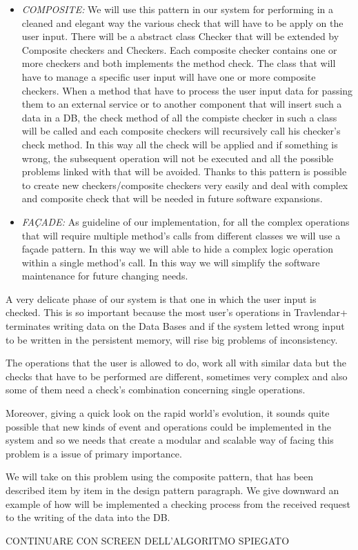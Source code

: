 \begin{itemize}
\item \emph{COMPOSITE:} We will use this pattern in our system for performing in a cleaned and elegant way the various check that will have to be apply on the user input. There will be a abstract class Checker that will be extended by Composite checkers and Checkers. Each composite checker contains one or more checkers and both implements the method check. The class that will have to manage a specific user input will have one or more composite checkers.
When a method that have to process the user input data for passing them to an external service or to another component that will insert such a data in a DB, the check method of all the compiste checker in such a class will be called and each composite checkers will recursively call his checker’s check method. In this way all the check will be applied and if something is wrong, the subsequent operation will not be executed and all the possible problems linked with that will be avoided. 
Thanks to this pattern is possible to create new checkers/composite checkers very easily and deal with complex and composite check that will be needed in future software expansions.

\item \emph{FAÇADE:} As guideline of our implementation, for all the complex operations that will require multiple method’s calls from different classes we will use a façade pattern. In this way we will able to hide a complex logic operation within a single method’s call. In this way we will simplify the software maintenance for future changing needs.
\end{itemize}

A very delicate phase of our system is that one in which the user input is checked. This is so important because the most user’s operations in Travlendar+ terminates writing data on the Data Bases and if the system letted wrong input to be written in the persistent memory, will rise big problems of inconsistency.

The operations that the user is allowed to do, work all with similar data but the checks that have to be performed are different, sometimes very complex and also some of them need a check’s combination concerning single operations.

Moreover, giving a quick look on the rapid world’s evolution, it sounds quite possible that new kinds of event and operations could be implemented in the system and so we needs that create a modular and scalable way of facing this problem is a issue of primary importance.

We will take on this problem using the composite pattern, that has been described item by item in the design pattern paragraph. We give downward an example of how will be implemented a checking process from the received request to the writing of the data into the DB.

CONTINUARE CON SCREEN DELL'ALGORITMO SPIEGATO